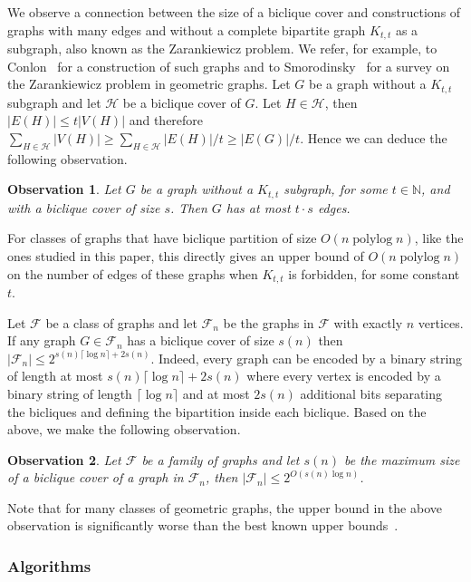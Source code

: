 \documentclass{amsart}
\newtheorem{observation}{Observation}
\DeclareMathOperator{\polylog}{\mathrm{polylog}}
\begin{document}
We observe a connection between the size of a biclique cover and constructions of graphs with many edges and without a complete bipartite graph $K_{t,t}$ as a subgraph, also known as the Zarankiewicz problem. We refer, for example, to Conlon~\cite{C22} for a construction of such graphs and to Smorodinsky~\cite{S24} for a survey on the Zarankiewicz problem in geometric graphs. Let $G$ be a graph without a $K_{t,t}$ subgraph and let $\mathcal{H}$ be a biclique cover of $G$. Let $H\in \mathcal{H}$, then $|E(H)|\le t |V(H)|$ and therefore $\sum_{H\in \mathcal{H}}|V(H)|\ge \sum_{H\in \mathcal{H}}|E(H)|/t \ge |E(G)|/t$. Hence we can deduce the following observation.
\begin{observation}\label{obs:K_ttfreeLB}
    Let $G$ be a graph without a $K_{t,t}$ subgraph, for some $t\in\mathbb{N}$, and with a biclique cover of size $s$.
    Then $G$ has at most $t\cdot s$ edges.
\end{observation}
For classes of graphs that have biclique partition of size $O(n\polylog n)$, like the ones studied in this paper, this directly gives an upper bound of $O(n\polylog n)$ on the number of edges of these graphs when $K_{t,t}$ is forbidden, for some constant $t$. 

Let $\mathcal{F}$ be a class of graphs and let $\mathcal{F}_n$ be the graphs in $\mathcal{F}$ with exactly $n$ vertices. If any graph $G\in \mathcal{F}_n$ has a biclique cover of size $s(n)$ then $|\mathcal{F}_n|\le 2^{s(n)\lceil\log n \rceil+2s(n)}$. Indeed, every graph can be encoded by a binary string of length at most $s(n)\lceil\log n\rceil+2s(n)$ where every vertex is encoded by a binary string of length $\lceil\log n\rceil$ and at most $2s(n)$ additional bits separating the bicliques and defining the bipartition inside each biclique.  
Based on the above, we make the following observation.

\begin{observation}\label{obs:graph_count}
    Let $\mathcal{F}$ be a family of graphs and let $s(n)$ be the maximum size of a biclique cover of a graph in $\mathcal{F}_n$, then $|\mathcal{F}_n| \leq 2^{O(s(n)\log n)}$. 
\end{observation}

Note that for many classes of geometric graphs, the upper bound in the above observation is significantly worse than the best known upper bounds~\cite{S21}.

\subsubsection{Algorithms}
\end{document}
